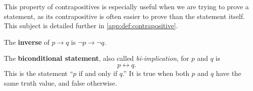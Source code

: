   This property of contrapositives is especially useful when we are trying to prove a statement,
  as its contrapositive is often easier to prove than the statement itself.
  This subject is detailed further in \ref{app:def:contrapositive}.

  The \textbf{inverse} of \(p \to q\) is \(\neg p \to \neg q\).

  The \textbf{biconditional statement}, also called \emph{bi-implication}, for $p$ and $q$ is \[p \leftrightarrow q.\] This is the statement
  ``\(p\) if and only if \(q\).''
  It is true when both \(p\) and \(q\) have the same truth value, and false otherwise.
\begin{table}[h]
  \centering
  \caption{Other ways of writing the biconditional statement \(p \leftrightarrow q\).}
  \label{tab:biconditionals}
\end{table}

